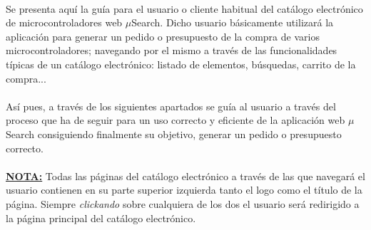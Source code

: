 \paragraph{}Se presenta aquí la guía para el usuario o cliente habitual del catálogo electrónico de microcontroladores web $\mu$Search. Dicho usuario básicamente utilizará la aplicación para generar un pedido o presupuesto de la compra de varios microcontroladores; navegando por el mismo a través de las funcionalidades típicas de un catálogo electrónico: listado de elementos, búsquedas, carrito de la compra...

\paragraph{}Así pues, a través de los siguientes apartados se guía al usuario a través del proceso que ha de seguir para un uso correcto y eficiente de la aplicación web $\mu$Search consiguiendo finalmente su objetivo, generar un pedido o presupuesto correcto.

\paragraph{}\underline{\textbf{NOTA:}} Todas las páginas del catálogo electrónico a través de las que navegará el usuario contienen en su parte superior izquierda tanto el logo como el título de la página. Siempre \textit{clickando} sobre cualquiera de los dos el usuario será redirigido a la página principal del catálogo electrónico.